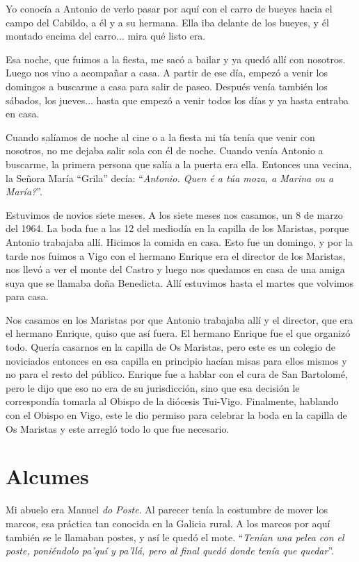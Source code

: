 \documentclass[12pt,a5paper]{book}
\begin{document}
Yo conocía a Antonio de verlo pasar por aquí con el carro de bueyes hacia el campo del Cabildo, a él y a su hermana. Ella iba delante de los bueyes, y él montado encima del carro... mira qué listo era.

Esa noche, que fuimos a la fiesta, me sacó a bailar y ya quedó allí con nosotros. Luego nos vino a acompañar a casa. A partir de ese día, empezó a venir los domingos a buscarme a casa para salir de paseo. Después venía también los sábados, los jueves... hasta que empezó a venir todos los días y ya hasta entraba en casa.

Cuando salíamos de noche al cine o a la fiesta mi tía tenía que venir con nosotros, no me dejaba salir sola con él de noche. Cuando venía Antonio a buscarme, la primera persona que salía a la puerta era ella. Entonces una vecina, la Señora María ``Grila'' decía: ``\textit{Antonio. Quen é a túa moza, a Marina ou a María?}''.

Estuvimos de novios siete meses. A los siete meses nos casamos, un 8 de marzo del 1964. La boda fue a las 12 del mediodía en la capilla de los Maristas, porque Antonio trabajaba allí. Hicimos la comida en casa. Esto fue un domingo, y por la tarde nos fuimos a Vigo con el hermano Enrique era el director de los Maristas, nos llevó a ver el monte del Castro y luego nos quedamos en casa de una amiga suya que se llamaba doña Benedicta. Allí estuvimos hasta el martes que volvimos para casa. 

Nos casamos en los Maristas por que Antonio trabajaba allí y el director, que era el hermano Enrique, quiso que así fuera. El hermano Enrique fue el que organizó todo. Quería casarnos en la capilla de Os Maristas, pero este es un colegio de noviciados entonces en esa capilla en principio hacían misas para ellos mismos y no para el resto del público. Enrique fue a hablar con el cura de San Bartolomé, pero le dijo que eso no era de su jurisdicción, sino que esa decisión le correspondía tomarla al Obispo de la diócesis Tui-Vigo. Finalmente, hablando con el Obispo en Vigo, este le dio permiso para celebrar la boda en la capilla de Os Maristas y este arregló todo lo que fue necesario.


\section*{Alcumes}


Mi abuelo era Manuel \textit{do Poste}. Al parecer tenía la costumbre de mover los marcos, esa práctica tan conocida en la Galicia rural. A los marcos por aquí también se le llamaban postes, y así le quedó el mote. ``\textit{Tenían una pelea con el poste, poniéndolo pa'quí y pa'llá, pero al final quedó donde tenía que quedar}''.
\end{document}
